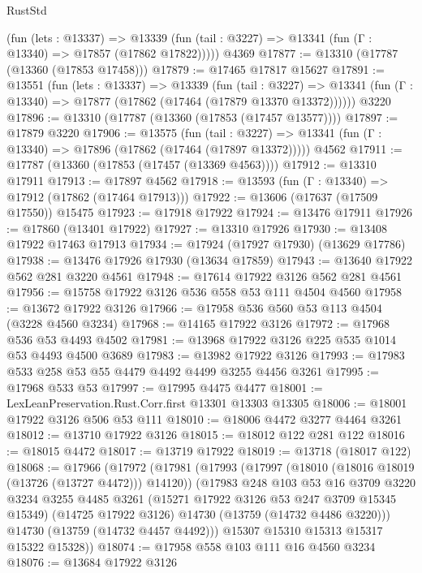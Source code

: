 \begin{lexlean}{RustStd}
\begin{coremodule}
      (fun (lets : @13337) =>
      @13339 (fun (tail : @3227) => @13341 (fun (Γ : @13340) => @17857 (@17862 @17822)))))
    @4369
@17877 := @13310 (@17787 (@13360 (@17853 @17458)))
@17879 := @17465 @17817 @15627
@17891 := @13551
    (fun (lets : @13337) =>
    @13339
      (fun (tail : @3227) =>
      @13341 (fun (Γ : @13340) => @17877 (@17862 (@17464 (@17879 @13370 @13372))))))
    @3220
@17896 := @13310 (@17787 (@13360 (@17853 (@17457 @13577))))
@17897 := @17879 @3220
@17906 := @13575
    (fun (tail : @3227) => @13341 (fun (Γ : @13340) => @17896 (@17862 (@17464 (@17897 @13372)))))
    @4562
@17911 := @17787 (@13360 (@17853 (@17457 (@13369 @4563))))
@17912 := @13310 @17911
@17913 := @17897 @4562
@17918 := @13593 (fun (Γ : @13340) => @17912 (@17862 (@17464 @17913)))
@17922 := @13606 (@17637 (@17509 @17550)) @15475
@17923 := @17918 @17922
@17924 := @13476 @17911
@17926 := @17860 (@13401 @17922)
@17927 := @13310 @17926
@17930 := @13408 @17922 @17463 @17913
@17934 := @17924 (@17927 @17930) (@13629 @17786)
@17938 := @13476 @17926 @17930 (@13634 @17859)
@17943 := @13640 @17922 @562 @281 @3220 @4561
@17948 := @17614 @17922 @3126 @562 @281 @4561
@17956 := @15758 @17922 @3126 @536 @558 @53 @111 @4504 @4560
@17958 := @13672 @17922 @3126
@17966 := @17958 @536 @560 @53 @113 @4504 (@3228 @4560 @3234)
@17968 := @14165 @17922 @3126
@17972 := @17968 @536 @53 @4493 @4502
@17981 := @13968 @17922 @3126 @225 @535 @1014 @53 @4493 @4500 @3689
@17983 := @13982 @17922 @3126
@17993 := @17983 @533 @258 @53 @55 @4479 @4492 @4499 @3255 @4456 @3261
@17995 := @17968 @533 @53
@17997 := @17995 @4475 @4477
@18001 := LexLeanPreservation.Rust.Corr.first @13301 @13303 @13305
@18006 := @18001 @17922 @3126 @506 @53 @111
@18010 := @18006 @4472 @3277 @4464 @3261
@18012 := @13710 @17922 @3126
@18015 := @18012 @122 @281 @122
@18016 := @18015 @4472
@18017 := @13719 @17922
@18019 := @13718 (@18017 @122)
@18068 := @17966
    (@17972
      (@17981
        (@17993
          (@17997 (@18010 (@18016 @18019 (@13726 (@13727 @4472))) @14120))
          (@17983
            @248
            @103
            @53
            @16
            @3709
            @3220
            @3234
            @3255
            @4485
            @3261
            (@15271 @17922 @3126 @53 @247 @3709 @15345 @15349)
            (@14725 @17922 @3126)
            @14730
            (@13759 (@14732 @4486 @3220)))
          @14730
          (@13759 (@14732 @4457 @4492)))
        @15307
        @15310
        @15313
        @15317
        @15322
        @15328))
@18074 := @17958 @558 @103 @111 @16 @4560 @3234
@18076 := @13684 @17922 @3126

\end{coremodule}
\end{lexlean}
